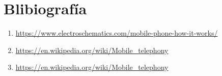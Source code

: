 \documentclass{article}
\begin{document}

\section{Blibiografía}
\begin{enumerate}
    \item \url{https://www.electroschematics.com/mobile-phone-how-it-works/}
    \item \url{https://en.wikipedia.org/wiki/Mobile_telephony}
    \item \url{https://en.wikipedia.org/wiki/Mobile_telephony}
\end{enumerate}
\end{document}
